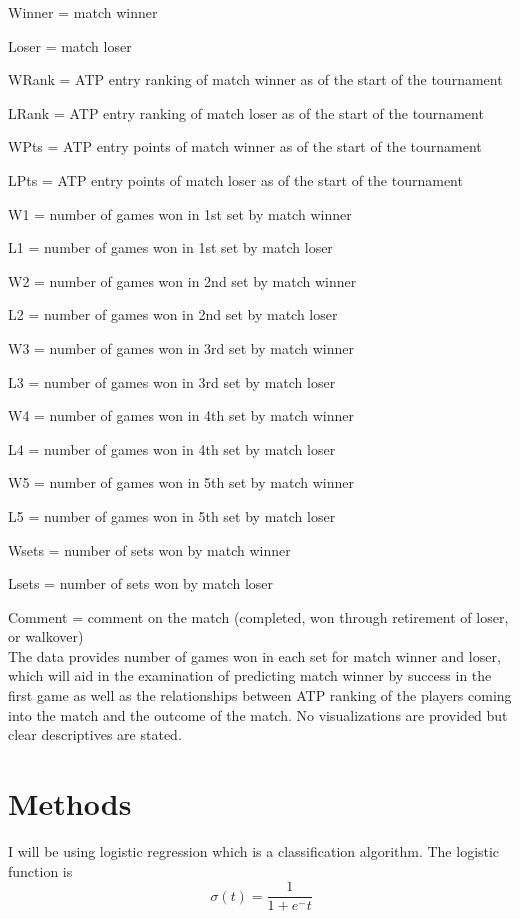 \documentclass[12pt]{article}
\begin{document}
Winner = match winner 

Loser = match loser

WRank = ATP entry ranking of match winner as of the start of the tournament

LRank = ATP entry ranking of match loser as of the start of the tournament

WPts = ATP entry points of match winner as of the start of the tournament

LPts = ATP entry points of match loser as of the start of the tournament

W1 = number of games won in 1st set by match winner

L1 = number of games won in 1st set by match loser

W2 = number of games won in 2nd set by match winner

L2 = number of games won in 2nd set by match loser

W3 = number of games won in 3rd set by match winner

L3 = number of games won in 3rd set by match loser

W4 = number of games won in 4th set by match winner

L4 = number of games won in 4th set by match loser

W5 = number of games won in 5th set by match winner

L5 = number of games won in 5th set by match loser

Wsets = number of sets won by match winner

Lsets = number of sets won by match loser

Comment = comment on the match (completed, won through retirement of loser, or walkover)\\

The data provides number of games won in each set for match winner and loser, which will 
aid in the examination of predicting match winner by success in the first game as well 
as the relationships between ATP ranking of the players coming into the match and the outcome 
of the match. No visualizations are provided but clear descriptives are stated.


\section{Methods}
\label{sec:meth}


I will be using logistic regression which is a classification algorithm. The logistic 
function is
\begin{equation}
  \label{eq:logreg}
    \ \sigma(t) = \frac{1}{1 + e^-t}
\end{equation}
 
\end{document}
